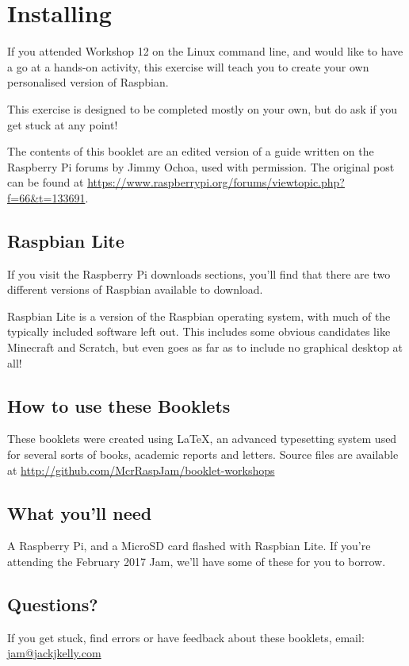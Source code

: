 \setcounter{section}{-1}
\section{Installing }

	If you attended Workshop 12 on the Linux command line, and would like to have a go at a hands-on activity, this exercise will teach you to create your own personalised version of Raspbian.
	
	This exercise is designed to be completed mostly on your own, but do ask if you get stuck at any point!
	
	The contents of this booklet are an edited version of a guide written on the Raspberry Pi forums by Jimmy Ochoa, used with permission.
	The original post can be found at \label{source} \url{https://www.raspberrypi.org/forums/viewtopic.php?f=66&t=133691}.
	

	\subsection*{Raspbian Lite}

	If you visit the Raspberry Pi downloads sections, you'll find that there are two different versions of Raspbian available to download.
	
	Raspbian Lite is a version of the Raspbian operating system, with much of the typically included software left out.
	This includes some obvious candidates like Minecraft and Scratch, but even goes as far as to include no graphical desktop at all!
		
	\subsection*{How to use these Booklets}
	
	
	
	
	
	These booklets were created using {\selectfont \LaTeX}, an advanced typesetting system used for several sorts of books, academic reports and letters. Source files are available at \url{http://github.com/McrRaspJam/booklet-workshops}
		
	
	\subsection*{What you'll need}
		
		A Raspberry Pi, and a MicroSD card flashed with Raspbian Lite. If you're attending the February 2017 Jam, we'll have some of these for you to borrow.
		
	\subsection*{Questions?}
		If you get stuck, find errors or have feedback about these booklets, email:
		\url{jam@jackjkelly.com}\label{email}